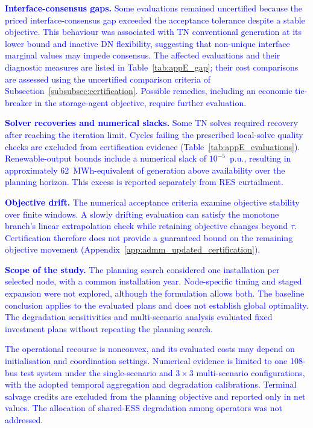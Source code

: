\documentclass[preprint,12pt]{elsarticle}
\begin{document}
\textcolor{blue}{
    \textbf{Interface-consensus gaps.} Some evaluations remained uncertified because the priced interface-consensus gap exceeded the acceptance tolerance despite a stable objective. This behaviour was associated with TN conventional generation at its lower bound and inactive DN flexibility, suggesting that non-unique interface marginal values may impede consensus. The affected evaluations and their diagnostic measures are listed in Table~\ref{tab:appE_gap}; their cost comparisons are assessed using the uncertified comparison criteria of Subsection~\ref{subsubsec:certification}. Possible remedies, including an economic tie-breaker in the storage-agent objective, require further evaluation.
}

\textcolor{blue}{
    \textbf{Solver recoveries and numerical slacks.} Some TN solves required recovery after reaching the iteration limit. Cycles failing the prescribed local-solve quality checks are excluded from certification evidence (Table~\ref{tab:appE_evaluations}). Renewable-output bounds include a numerical slack of $10^{-5}$~p.u., resulting in approximately 62~MWh-equivalent of generation above availability over the planning horizon. This excess is reported separately from RES curtailment.
}

\textcolor{blue}{
    \textbf{Objective drift.} The numerical acceptance criteria examine objective stability over finite windows. A slowly drifting evaluation can satisfy the monotone branch's linear extrapolation check while retaining objective changes beyond $\tau$. Certification therefore does not provide a guaranteed bound on the remaining objective movement (Appendix~\ref{app:admm_updated_certification}).
}

\textcolor{blue}{
    \textbf{Scope of the study.} The planning search considered one installation per selected node, with a common installation year. Node-specific timing and staged expansion were not explored, although the formulation allows both. The baseline conclusion applies to the evaluated plans and does not establish global optimality. The degradation sensitivities and multi-scenario analysis evaluated fixed investment plans without repeating the planning search.
}

\textcolor{blue}{
    The operational recourse is nonconvex, and its evaluated costs may depend on initialisation and coordination settings. Numerical evidence is limited to one 108-bus test system under the single-scenario and $3 \times 3$ multi-scenario configurations, with the adopted temporal aggregation and degradation calibrations. Terminal salvage credits are excluded from the planning objective and reported only in net values. The allocation of shared-ESS degradation among operators was not addressed.
}
\end{document}
